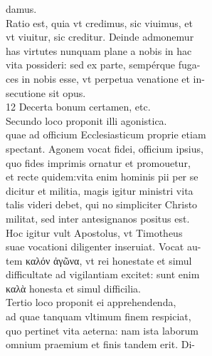 \documentclass{article}
\begin{document}
\begin{pages}
                damus. \\
                Ratio est, quia vt credimus, sic viuimus, et \\
                vt viuitur, sic creditur. Deinde admonemur \\
                has virtutes nunquam plane a nobis in hac \\
                vita possideri: sed ex parte, sempérque fuga- \\
                ces in nobis esse, vt perpetua venatione et in- \\
                secutione sit opus. \\
                12 Decerta bonum certamen, etc. \\
                Secundo loco proponit illi agonistica. \\
                quae ad officium Ecclesiasticum proprie etiam \\
                spectant. Agonem vocat fidei, officium ipsius, \\
                quo fides imprimis ornatur et promouetur, \\
                et recte quidem:vita enim hominis pii per se \\
                dicitur et militia, magis igitur ministri vita \\
                talis videri debet, qui no simpliciter Christo \\
                militat, sed inter antesignanos positus est. \\
                Hoc igitur vult Apostolus, vt Timotheus \\
                suae vocationi diligenter inseruiat. Vocat au- \\
                tem καλόν ἀγῶνα, vt rei honestate et simul \\
                difficultate ad vigilantiam excitet: sunt enim \\
                καλὰ honesta et simul difficilia. \\
                Tertio loco proponit ei apprehendenda, \\
                ad quae tanquam vltimum finem respiciat, \\
                quo pertinet vita aeterna: nam ista laborum \\
                omnium praemium et finis tandem erit. Di- \\

\end{pages}
\end{document}
